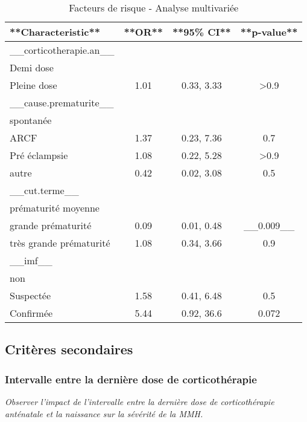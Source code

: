 \documentclass[
  10pt,
  a4paper,
]{scrartcl}
\begin{document}
\begin{table}

\caption{\label{tab:multi}Facteurs de risque - Analyse multivariée}
\centering
\begin{tabular}[t]{l|c|c|c}
\hline
**Characteristic** & **OR** & **95\% CI** & **p-value**\\
\hline
\_\_corticotherapie.an\_\_ &  &  & \\
\hline
Demi dose &  &  & \\
\hline
Pleine dose & 1.01 & 0.33, 3.33 & >0.9\\
\hline
\_\_cause.prematurite\_\_ &  &  & \\
\hline
spontanée &  &  & \\
\hline
ARCF & 1.37 & 0.23, 7.36 & 0.7\\
\hline
Pré éclampsie & 1.08 & 0.22, 5.28 & >0.9\\
\hline
autre & 0.42 & 0.02, 3.08 & 0.5\\
\hline
\_\_cut.terme\_\_ &  &  & \\
\hline
prématurité moyenne &  &  & \\
\hline
grande prématurité & 0.09 & 0.01, 0.48 & \_\_0.009\_\_\\
\hline
très grande prématurité & 1.08 & 0.34, 3.66 & 0.9\\
\hline
\_\_imf\_\_ &  &  & \\
\hline
non &  &  & \\
\hline
Suspectée & 1.58 & 0.41, 6.48 & 0.5\\
\hline
Confirmée & 5.44 & 0.92, 36.6 & 0.072\\
\hline
\end{tabular}
\end{table}

\hypertarget{crituxe8res-secondaires}{%
\subsection{Critères secondaires}\label{crituxe8res-secondaires}}

\hypertarget{intervalle-entre-la-derniuxe8re-dose-de-corticothuxe9rapie}{%
\subsubsection{Intervalle entre la dernière dose de
corticothérapie}\label{intervalle-entre-la-derniuxe8re-dose-de-corticothuxe9rapie}}

\emph{Observer l'impact de l'intervalle entre la dernière dose de
corticothérapie anténatale et la naissance sur la sévérité de la MMH.}
\end{document}
